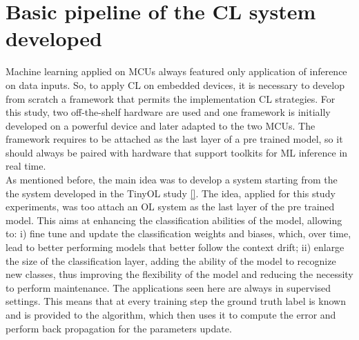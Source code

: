 \documentclass[12pt]{report}
\begin{document}
\section{Basic pipeline of the CL system developed}
\label{basic_system}
Machine learning applied on MCUs always featured only application of inference on data inputs. So, to apply CL on embedded devices, it is necessary to develop from scratch a framework that permits the implementation CL strategies. For this study, two off-the-shelf hardware are used and one framework is initially developed on a powerful device and later adapted to the two MCUs. The framework requires to be attached as the last layer of a pre trained model, so it should always be paired with hardware that support toolkits for ML inference in real time.\\
As mentioned before, the main idea was to develop a system starting from the the system developed in the TinyOL study \ref{}. The idea, applied for this study experiments, was too attach an OL system as the last layer of the pre trained model. This aims at enhancing the classification abilities of the model, allowing to: i) fine tune and update the classification weights and biases, which, over time, lead to better performing models that better follow the context drift; ii) enlarge the size of the classification layer, adding the ability of the model to recognize new classes, thus improving the flexibility of the model and reducing the necessity to perform maintenance. The applications seen here are always in supervised settings. This means that at every training step the ground truth label is known and is provided to the algorithm, which then uses it to compute the error and perform back propagation for the parameters update.\\
\end{document}
